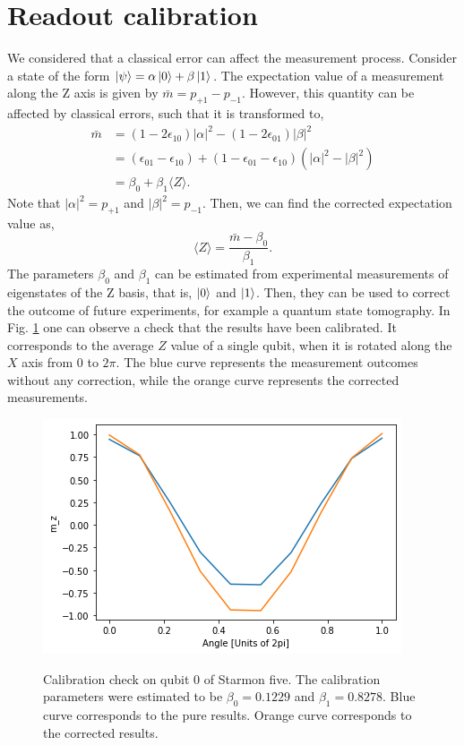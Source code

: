 \documentclass[11pt]{article}
\begin{document}
\section{Readout calibration}
We considered that a classical error can affect the measurement process. Consider a state of the form $\ket{\psi} = \alpha\ket{0}+\beta\ket{1}$. The expectation value of a measurement along the Z axis is given by $\bar{m}=p_{+1}-p_{-1}$. However, this quantity can be affected by classical errors, such that it is transformed to,
\begin{align}
\bar{m} &= (1-2\epsilon_{10})|\alpha|^2-(1-2\epsilon_{01})|\beta|^2\\
&=(\epsilon_{01}-\epsilon_{10})+(1-\epsilon_{01}-\epsilon_{10})(|\alpha|^2-|\beta|^2)\\
&= \beta_0 + \beta_1 \langle Z\rangle.
\end{align}
Note that $|\alpha|^2=p_{+1}$ and $|\beta|^2=p_{-1}$. Then, we can find the corrected expectation value as,
\begin{equation}
\langle Z\rangle = \frac{\bar{m}-\beta_0}{\beta_1}.
\end{equation}
The parameters $\beta_0$ and $\beta_1$ can be estimated from experimental measurements of eigenstates of the Z basis, that is, $\ket{0}$ and $\ket{1}$. Then, they can be used to correct the outcome of future experiments, for example a quantum state tomography. In Fig. \ref{fig:3a} one can observe a check that the results have been calibrated. It corresponds to the average $Z$ value of a single qubit, when it is rotated along the $X$ axis from $0$ to $2\pi$. The blue curve represents the measurement outcomes without any correction, while the orange curve represents the corrected measurements. 
\begin{figure}[H]
    \centering
            \includegraphics[totalheight=6cm]{Figures/tomography.png}
        \label{fig:3a}\caption{Calibration check on qubit 0 of Starmon five. The calibration parameters were estimated to be $\beta_0 = 0.1229$ and $\beta_1=0.8278$. Blue curve corresponds to the pure results. Orange curve corresponds to the corrected results.}
\end{figure}
\end{document}
